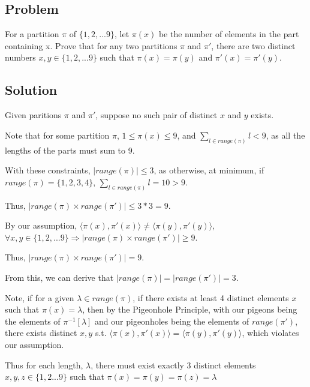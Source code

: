 \documentclass{article}
\newcommand{\pair}[1]{\langle #1 \rangle}
\begin{document}
\begin{center}\item\section*{Problem}\end{center}
For a partition $\pi$ of $\{1,2,...9\}$, let $\pi(x)$ be the number
of elements in the part containing x.
Prove that for any two partitions $\pi$ and $\pi'$, there are two distinct
numbers $x,y \in \{1,2,...9\}$ such that $\pi(x)=\pi(y)$ and
$\pi'(x)=\pi'(y)$.

\begin{center}\item\section*{Solution}\end{center}
Given paritions $\pi$ and $\pi'$, suppose no such pair of distinct $x$ and $y$ exists.

Note that for some partition $\pi$, $1 \leq \pi(x) \leq 9$, and 
$\displaystyle\sum_{l\in range(\pi)} l<9$, as all the lengths of the parts must sum to 9.

With these constraints, $|range(\pi)|\leq 3$, as otherwise, at minimum, if 
$range(\pi)=\{1,2,3,4\}$, $\displaystyle\sum_{l\in range(\pi)} l=10 > 9$.

Thus, $|range(\pi) \times range(\pi')|\leq 3*3=9$.

By our assumption, $\pair{\pi(x),\pi'(x)} \not= \pair{\pi(y),\pi'(y)}$,
$\forall x,y \in \{1,2,...9\} \Rightarrow 
|range(\pi) \times range(\pi')|\geq 9$.

Thus, $|range(\pi)\times range(\pi')|=9$.

From this, we can derive that $|range(\pi)|=|range(\pi')|=3$.

Note, if for a given $\lambda \in range(\pi)$, if there exists at least 4
distinct elements $x$ such that $\pi(x)=\lambda$, then by the 
Pigeonhole Principle, with our pigeons being the elements of 
$\pi^{-1}[\lambda]$ and our pigeonholes being the elements of $range(\pi')$, there exists distinct $x,y$ s.t. 
$\pair{\pi(x),\pi'(x)}=\pair{\pi(y),\pi'(y)}$, which violates our assumption.

Thus for each length, $\lambda$, there must exist exactly 3 distinct
elements $x,y,z \in \{1,2...9\}$ such that $\pi(x)=\pi(y)=\pi(z)=\lambda$
\end{document}
